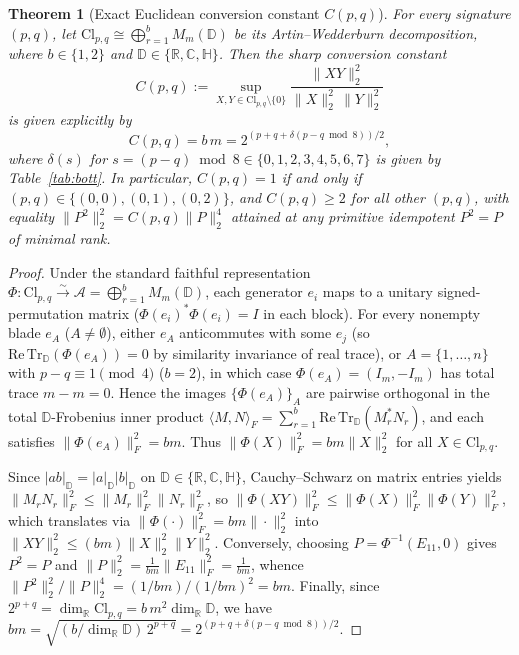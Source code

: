 \documentclass[11pt]{article}
\newtheorem{theorem}{Theorem}[section]
\theoremstyle{definition}
\newcommand{\Cl}{\mathrm{Cl}}
\newcommand{\R}{\mathbb{R}}
\newcommand{\C}{\mathbb{C}}
\newcommand{\HH}{\mathbb{H}}
\begin{document}
\begin{theorem}[Exact Euclidean conversion constant $C(p,q)$]\label{thm:bott}
For every signature $(p,q)$, let $\Cl_{p,q}\cong\bigoplus_{r=1}^{b} M_m(\mathbb{D})$ be its Artin--Wedderburn decomposition, where $b\in\{1,2\}$ and $\mathbb{D}\in\{\R,\C,\HH\}$. Then the sharp conversion constant
\[
  C(p,q) := \sup_{X,Y\in\Cl_{p,q}\setminus\{0\}} \frac{\|XY\|_2^2}{\|X\|_2^2\,\|Y\|_2^2}
\]
is given explicitly by
\begin{equation}\label{eq:bott}
  C(p,q) = b\,m = 2^{(p+q+\delta(p-q\bmod 8))/2},
\end{equation}
where $\delta(s)$ for $s=(p-q)\bmod 8\in\{0,1,2,3,4,5,6,7\}$ is given by Table~\ref{tab:bott}. In particular, $C(p,q)=1$ if and only if $(p,q)\in\{(0,0),(0,1),(0,2)\}$, and $C(p,q)\ge 2$ for all other $(p,q)$, with equality $\|P^2\|_2^2=C(p,q)\|P\|_2^4$ attained at any primitive idempotent $P^2=P$ of minimal rank.
\end{theorem}
\begin{proof}
Under the standard faithful representation $\Phi:\Cl_{p,q}\xrightarrow{\sim}\mathcal{A}=\bigoplus_{r=1}^b M_m(\mathbb{D})$, each generator $e_i$ maps to a unitary signed-permutation matrix ($\Phi(e_i)^*\Phi(e_i)=I$ in each block). For every nonempty blade $e_A$ ($A\ne\emptyset$), either $e_A$ anticommutes with some $e_j$ (so $\mathrm{Re}\,\mathrm{Tr}_{\mathbb{D}}(\Phi(e_A))=0$ by similarity invariance of real trace), or $A=\{1,\dots,n\}$ with $p-q\equiv 1\pmod 4$ ($b=2$), in which case $\Phi(e_A)=(I_m,-I_m)$ has total trace $m-m=0$. Hence the images $\{\Phi(e_A)\}_A$ are pairwise orthogonal in the total $\mathbb{D}$-Frobenius inner product $\langle M,N\rangle_F=\sum_{r=1}^b \mathrm{Re}\,\mathrm{Tr}_{\mathbb{D}}(M_r^*N_r)$, and each satisfies $\|\Phi(e_A)\|_F^2=bm$. Thus $\|\Phi(X)\|_F^2=bm\|X\|_2^2$ for all $X\in\Cl_{p,q}$.

Since $|ab|_{\mathbb{D}}=|a|_{\mathbb{D}}|b|_{\mathbb{D}}$ on $\mathbb{D}\in\{\R,\C,\HH\}$, Cauchy--Schwarz on matrix entries yields $\|M_rN_r\|_F^2\le\|M_r\|_F^2\|N_r\|_F^2$, so $\|\Phi(XY)\|_F^2\le\|\Phi(X)\|_F^2\|\Phi(Y)\|_F^2$, which translates via $\|\Phi(\cdot)\|_F^2=bm\|\cdot\|_2^2$ into $\|XY\|_2^2\le(bm)\|X\|_2^2\|Y\|_2^2$. Conversely, choosing $P=\Phi^{-1}(E_{11},0)$ gives $P^2=P$ and $\|P\|_2^2=\frac{1}{bm}\|E_{11}\|_F^2=\frac{1}{bm}$, whence $\|P^2\|_2^2/\|P\|_2^4=(1/bm)/(1/bm)^2=bm$. Finally, since $2^{p+q}=\dim_\R\Cl_{p,q}=b\,m^2\dim_\R\mathbb{D}$, we have $bm=\sqrt{(b/\dim_\R\mathbb{D})\,2^{p+q}}=2^{(p+q+\delta(p-q\bmod 8))/2}$.
\end{proof}
\end{document}
